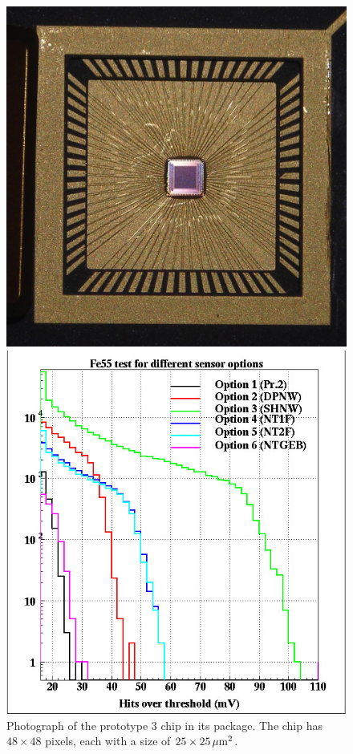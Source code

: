 \begin{figure}
    \centering
    \begin{minipage}[t]{0.49\textwidth}    \includegraphics[width=\linewidth]{VertexDetector/Chronopix/Chronopix_image}
    \caption{Photograph of the prototype 3 chip in its package. The chip has $48\times48$ pixels, each with a size of $25\times\unit[25]{\micron^2}$.}
    \label{fig:VertexDetector:ChronoPixel:image}
\end{minipage}\hfill
\begin{minipage}[t]{0.49\textwidth}
    \includegraphics[width=\linewidth]{VertexDetector/Chronopix/Fe55tst}

\end{minipage}
\end{figure}
